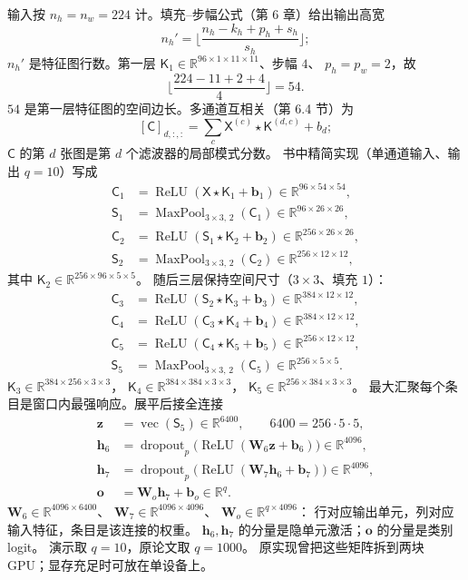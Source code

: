 输入按 $n_h=n_w=224$ 计。填充--步幅公式（第 6 章）给出输出高宽
\[
n_h'
=
\biggl\lfloor
\frac{n_h-k_h+p_h+s_h}{s_h}
\biggr\rfloor;
\]
$n_h'$ 是特征图行数。第一层 $\mathsf{K}_1\in\mathbb{R}^{96\times 1\times 11\times 11}$、步幅 $4$、
$p_h=p_w=2$，故
\[
\biggl\lfloor
\frac{224-11+2+4}{4}
\biggr\rfloor
=
54.
\]
$54$ 是第一层特征图的空间边长。多通道互相关（第 6.4 节）为
\[
[\mathsf{C}]_{d,:,:}
=
\sum_{c}
\mathsf{X}^{(c)}\star\mathsf{K}^{(d,c)}
+
b_d;
\]
$\mathsf{C}$ 的第 $d$ 张图是第 $d$ 个滤波器的局部模式分数。
书中精简实现（单通道输入、输出 $q=10$）写成
\begin{align*}
\mathsf{C}_1
&=
\operatorname{ReLU}(\mathsf{X}\star\mathsf{K}_1+\bm{b}_1)
\in\mathbb{R}^{96\times 54\times 54},\\
\mathsf{S}_1
&=
\operatorname{MaxPool}_{3\times 3,\,2}(\mathsf{C}_1)
\in\mathbb{R}^{96\times 26\times 26},\\
\mathsf{C}_2
&=
\operatorname{ReLU}(\mathsf{S}_1\star\mathsf{K}_2+\bm{b}_2)
\in\mathbb{R}^{256\times 26\times 26},\\
\mathsf{S}_2
&=
\operatorname{MaxPool}_{3\times 3,\,2}(\mathsf{C}_2)
\in\mathbb{R}^{256\times 12\times 12},
\end{align*}
其中 $\mathsf{K}_2\in\mathbb{R}^{256\times 96\times 5\times 5}$。
随后三层保持空间尺寸（$3\times 3$、填充 $1$）：
\begin{align*}
\mathsf{C}_3
&=
\operatorname{ReLU}(\mathsf{S}_2\star\mathsf{K}_3+\bm{b}_3)
\in\mathbb{R}^{384\times 12\times 12},\\
\mathsf{C}_4
&=
\operatorname{ReLU}(\mathsf{C}_3\star\mathsf{K}_4+\bm{b}_4)
\in\mathbb{R}^{384\times 12\times 12},\\
\mathsf{C}_5
&=
\operatorname{ReLU}(\mathsf{C}_4\star\mathsf{K}_5+\bm{b}_5)
\in\mathbb{R}^{256\times 12\times 12},\\
\mathsf{S}_5
&=
\operatorname{MaxPool}_{3\times 3,\,2}(\mathsf{C}_5)
\in\mathbb{R}^{256\times 5\times 5}.
\end{align*}
$\mathsf{K}_3\in\mathbb{R}^{384\times 256\times 3\times 3}$，
$\mathsf{K}_4\in\mathbb{R}^{384\times 384\times 3\times 3}$，
$\mathsf{K}_5\in\mathbb{R}^{256\times 384\times 3\times 3}$。
最大汇聚每个条目是窗口内最强响应。展平后接全连接
\begin{align*}
\bm{z}
&=
\operatorname{vec}(\mathsf{S}_5)
\in\mathbb{R}^{6400},
\qquad
6400=256\cdot 5\cdot 5,\\
\bm{h}_6
&=
\operatorname{dropout}_{p}
\bigl(\operatorname{ReLU}(\bm{W}_6\bm{z}+\bm{b}_6)\bigr)
\in\mathbb{R}^{4096},\\
\bm{h}_7
&=
\operatorname{dropout}_{p}
\bigl(\operatorname{ReLU}(\bm{W}_7\bm{h}_6+\bm{b}_7)\bigr)
\in\mathbb{R}^{4096},\\
\bm{o}
&=
\bm{W}_o\bm{h}_7+\bm{b}_o
\in\mathbb{R}^{q}.
\end{align*}
$\bm{W}_6\in\mathbb{R}^{4096\times 6400}$、
$\bm{W}_7\in\mathbb{R}^{4096\times 4096}$、
$\bm{W}_o\in\mathbb{R}^{q\times 4096}$：
行对应输出单元，列对应输入特征，条目是该连接的权重。
$\bm{h}_6,\bm{h}_7$ 的分量是隐单元激活；$\bm{o}$ 的分量是类别 logit。
演示取 $q=10$，原论文取 $q=1000$。
原实现曾把这些矩阵拆到两块 GPU；显存充足时可放在单设备上。

